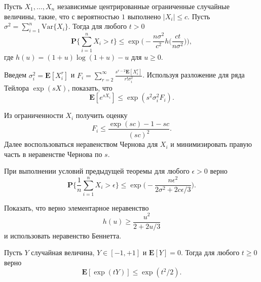 \begin{problem}
Пусть $X_1,\dots, X_n$ независимые центрированные ограниченные случайные величины, такие, что с вероятностью $1$ выполнено $|X_i|\leq c$.
Пусть $\sigma^2 = \sum_{i=1}^n\text{Var}\{X_i\}$.
 Тогда для любого $t>0$ 
\begin{equation*}
\mathbf{P}\bigg\{\sum_{i=1}^n X_i>t\biggr\}\leq \exp\bigg(-\frac{n\sigma^2}{c^2}h\bigg(\frac{ct}{n\sigma^2}\biggr)\biggr),
\end{equation*}
где $h(u) = (1+u)\log(1+u)-u$ для $u\geq 0$.
\end{problem}
\begin{remark}
Введем $\sigma_i^2 = \mathbf{E}[X_i^r]$ и $F_i = \sum_{r=2}^{\infty}\frac{s^{r-2}\mathbf{E}[X_i^r]}{r!\sigma_i^2}$.
Используя разложение для ряда Тейлора $\exp(sX)$, показать, что 
\begin{equation*}
\mathbf{E}[e^{sX_i}]\leq \exp(s^2\sigma^2_iF_i).
\end{equation*}

Из ограниченности  $X_i$ получить оценку
\begin{equation*}
F_i\leq \frac{\exp(sc)-1-sc}{(sc)^2}.
\end{equation*} 
Далее воспользоваться неравенством Чернова для $X_i$ и минимизировать правую часть в неравенстве Чернова по $s$.
\end{remark}

\begin{problem}
При выполнении условий предыдущей теоремы для любого  $\epsilon>0$ верно 
\begin{equation*}
\mathbf{P}\bigg\{\frac{1}{n}\sum_{i=1}^n X_i>\epsilon\biggr\}\leq \exp\bigg(-\frac{n\epsilon^2}{2\sigma^2+2c\epsilon/3}\biggr).
\end{equation*}
\end{problem}

\begin{remark} 
Показать, что верно элементарное неравенство 
\begin{equation*}
h(u)\geq \frac{u^2}{2+2u/3}
\end{equation*}
и использовать неравенство Беннетта.
\end{remark}

\begin{problem} Пусть $Y$ случайная величина,  $Y\in [-1,+1]$ и $\mathbf{E}[Y]=0$. Тогда для любого $t\geq 0$ верно 
\begin{equation*}
\mathbf{E}[\exp(tY)]\leq \exp(t^2/2).
\end{equation*}
\end{problem}

